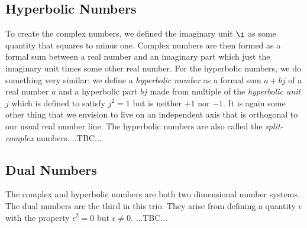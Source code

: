 




\subsection{Hyperbolic Numbers}
To create the complex numbers, we defined the imaginary unit $\i$ as some quantity that squares to minus one. Complex numbers are then formed as a formal sum between a real number and an imaginary part which just the imaginary unit times some other real number. For the hyperbolic numbers, we do something very similar: we define a \emph{hyperbolic number} as a formal sum $a + b j$ of a real number $a$ and a hyperbolic part $b j$ made from multiple of the \emph{hyperbolic unit} $j$ which is defined to satisfy $j^2 = 1$ but is neither $+1$ nor $-1$. It is again some other thing that we envision to live on an independent axis that is orthogonal to our usual real number line. The hyperbolic numbers are also called the \emph{split-complex} numbers. ..TBC...




\subsection{Dual Numbers}
The complex and hyperbolic numbers are both two dimensional number systems. The dual numbers are the third in this trio. They arise from defining a quantity $\epsilon$ with the property $\epsilon^2 = 0$ but $\epsilon \neq 0$. ...TBC...




